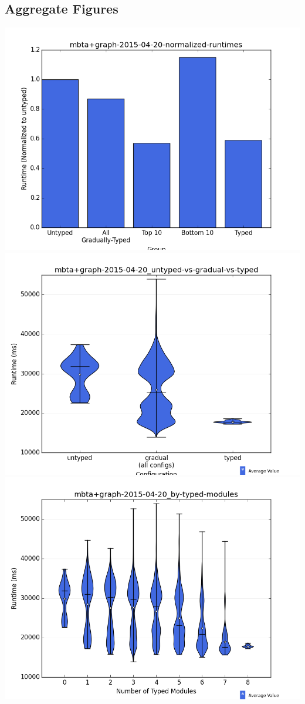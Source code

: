\documentclass{article}
\begin{document}
\subsection{Aggregate Figures}
\includegraphics[width=\textwidth]{mbta+graph-2015-04-20-normalized-runtimes-bar.png}
\includegraphics[width=\textwidth]{mbta+graph-2015-04-20_untyped-vs-gradual-vs-typed-violin.png}
\includegraphics[width=\textwidth]{mbta+graph-2015-04-20_by-typed-modules-violin.png}
\end{document}
